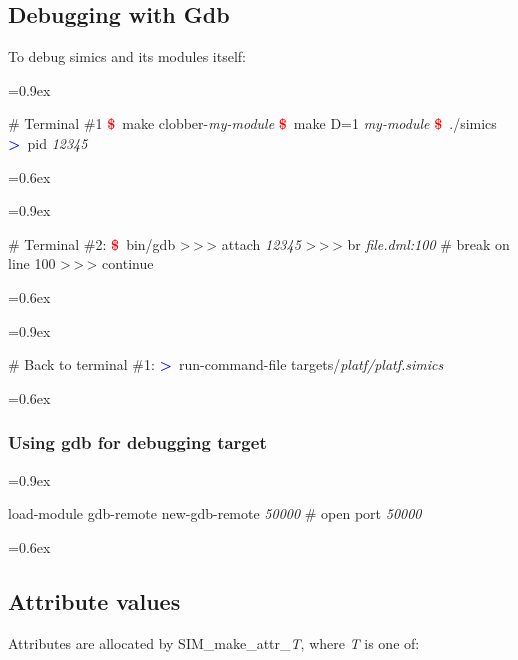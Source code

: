 \documentclass[8pt]{extarticle}
\newenvironment{code}[1][]{%
\begin{prebox}[#1]\obeylines%
\fontdimen2\font=0.9ex%
}{%
\end{prebox}%
\fontdimen2\font=0.6ex%
}
\newcommand{\cod}[1]{\colorbox{green!15}{#1}}
\newcommand{\ind}{\hphantom{~~~}}
\newcommand{\prompt}{\textcolor{red}{\textbf{\$}\ }}
\newcommand{\sprompt}{\textcolor{blue}{\textbf{>}\ }}
\newcommand{\p}[1]{\textit{\large#1}}
\begin{document}
\begin{multicols*}{3}
\subsection{Debugging with Gdb}
To debug simics and its modules itself:
        \begin{code}
            \# Terminal \#1
            \prompt make clobber-\p{my-module}
            \prompt make D=1 \p{my-module}
            \prompt ./simics
            \sprompt pid
            \p{12345}
        \end{code}

        \begin{code}[colback=blue!15]
            \# Terminal \#2:
            \prompt bin/gdb
            >\,>\,> attach \p{12345}
            >\,>\,> br \p{file.dml:100}  \ind \# break on line 100
            >\,>\,> continue
        \end{code}

        \begin{code}
            \# Back to terminal \#1:
            \sprompt run-command-file targets/\p{platf/platf.simics}
        \end{code}


\subsubsection{Using gdb for debugging target}
\begin{code}
    load-module gdb-remote
    new-gdb-remote \p{50000}  \ind \# open port \p{50000}
\end{code}


\subsection{Attribute values}

    Attributes are allocated by \cod{SIM\_make\_attr\_\p{T}}, where
    \p{T} is one of:


\end{multicols*}
\end{document}
